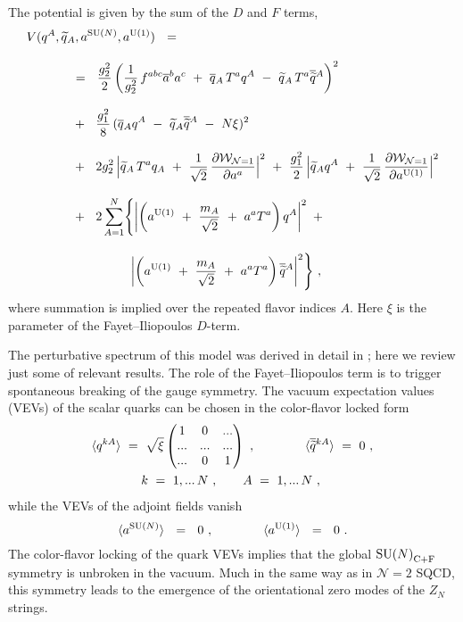 \documentclass[12pt]{article}
\def\beq{\begin{equation}}
\def\eeq{\end{equation}}
\newcommand{\ntwo}{${\mathcal N}=2$ }
\newcommand{\p}{\partial}
\newcommand{\wt}{\widetilde}
\newcommand{\ov}{\overline}
\newcommand{\mc}[1]{\mathcal{#1}}
\def\cfl {$\text{SU($N$)}_{\rm C+F}$ }
\newcommand{\aU}{a^{\rm U(1)}}
\newcommand{\aN}{a^\text{SU($N$)}}
\begin{document}
The potential is given by the  sum of the $ D $ and $ F $ terms,
\begin{align}
%
\notag
	& V(q^A, \wt{q}{}_A, \aN, \aU) ~~=~~ 
	\\[3mm]
%
\notag
	&\qquad\quad ~~=~~
			\frac{g_2^2}{2} \left( \frac{1}{g_2^2}\,f^{abc}\ov{a}{}^b a^c 
				~+~ \ov{q}{}_A\, T^a q^A ~-~ \wt{q}{}_A\, T^a \ov{\wt{q}}{}^A \right)^2 
	\\[3mm]
%
\label{V}
	&\qquad\quad ~~+~~
		\frac{g_1^2}{8}\, (\ov{q}{}_A q^A ~-~ \wt{q}{}_A \ov{\wt{q}}{}^A ~-~ N\xi )^2
	\\[3mm]
%
\notag
	&\qquad\quad ~~+~~
		2g_2^2\, \Bigl| \wt{q}{}_A\,T^a q_A ~+~ 
			\frac{1}{\sqrt{2}}\, \frac{\p\mc{W}_{\mc{N}=1}}{\p a^a} \Bigr|^2
	~+~
	\frac{g_1^2}{2}\, \Bigl| \wt{q}{}_A q^A ~+~ 
			\frac{1}{\sqrt{2}}\, \frac{\p\mc{W}_{\mc{N}=1}}{\p\aU} \Bigr|^2
	\\[3mm]
%
\notag
	&\qquad\quad ~~+~~
	2 \sum_{A=1}^{N} \Biggl\{  
		\left| \left( \aU ~+~ \frac{m_A}{\sqrt{2}} ~+~ a^a T^a \right) q^A \right|^2  ~+~
	\\[3mm]
%
\notag
	&\phantom{\qquad\quad ~~+~~ 2 \sum_{A=1}^{N} \Biggl\{  }
		\left| \left( \aU ~+~ \frac{m_A}{\sqrt{2}} ~+~ a^a T^a \right) \ov{\wt{q}}{}^A \right|^2  
			\Biggr\}~,
\end{align}
	where summation is implied over the repeated flavor indices $A$.
	Here $\xi$ is the parameter of the Fayet--Iliopoulos $ D $-term. 

	The perturbative spectrum of this model was derived in detail in \cite{SYrev}; here
	we review just some of relevant results. 
	The role of the Fayet--Iliopoulos term is to trigger spontaneous breaking of the gauge 
	symmetry.
	The vacuum expectation values (VEVs) of the scalar quarks can be chosen in the 
	color-flavor locked form
\begin{align}
%
\notag
&
	\langle q^{kA} \rangle ~=~ \sqrt{\xi} 
		\begin{pmatrix}
			 1  &   0  &  ... \\
			... &  ... &  ... \\
			... &   0  &  1 
		\end{pmatrix} ~,
	\qquad\qquad 
	\langle \ov{\wt{q}}{}^{kA} \rangle ~=~ 0~,
	\\
%
\label{qVEV}
&
	\qquad\qquad  k~=~ 1,...\, N~, \qquad  A ~=~ 1,...\, N~,
\end{align}
	while the VEVs of the adjoint fields vanish
\beq
\label{aVEV}
	\langle \aN \rangle  ~~=~~ 0~, \qquad\qquad  \langle \aU \rangle ~~=~~ 0~.
\eeq
The color-flavor locking of the quark VEVs implies that the global \cfl 
	symmetry is unbroken in the vacuum.
	Much in the same way as in \ntwo SQCD, this symmetry leads to the emergence of the orientational
	zero modes of the $ Z_N $ strings.
\end{document}
